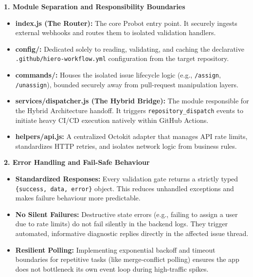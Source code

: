 \documentclass[11pt]{article}
\begin{document}
\vspace{5pt}
\noindent
\textbf{1. Module Separation and Responsibility Boundaries}
\begin{itemize}[leftmargin=18pt,itemsep=2pt,topsep=0pt]
\item \textbf{index.js (The Router):} The core Probot entry point. It securely ingests external webhooks and routes them to isolated validation handlers.
\item \textbf{config/:} Dedicated solely to reading, validating, and caching the declarative \texttt{.github/hiero-workflow.yml} configuration from the target repository.
\item \textbf{commands/:} Houses the isolated issue lifecycle logic (e.g., \texttt{/assign}, \texttt{/unassign}), bounded securely away from pull-request manipulation layers.
\item \textbf{services/dispatcher.js (The Hybrid Bridge):} The module responsible for the Hybrid Architecture handoff. It triggers \texttt{repository\_dispatch} events to initiate heavy CI/CD execution natively within GitHub Actions.
\item \textbf{helpers/api.js:} A centralized Octokit adapter that manages API rate limits, standardizes HTTP retries, and isolates network logic from business rules.
\end{itemize}

\vspace{5pt}
\noindent
\textbf{2. Error Handling and Fail-Safe Behaviour}
\begin{itemize}[leftmargin=18pt,itemsep=2pt,topsep=0pt]
\item \textbf{Standardized Responses:} Every validation gate returns a strictly typed \texttt{\{success, data, error\}} object. This reduces unhandled exceptions and makes failure behaviour more predictable.
\item \textbf{No Silent Failures:} Destructive state errors (e.g., failing to assign a user due to rate limits) do not fail silently in the backend logs. They trigger automated, informative diagnostic replies directly in the affected issue thread.
\item \textbf{Resilient Polling:} Implementing exponential backoff and timeout boundaries for repetitive tasks (like merge-conflict polling) ensures the app does not bottleneck its own event loop during high-traffic spikes.
\end{itemize}
\end{document}
